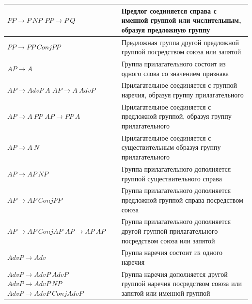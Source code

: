 \begin{longtable}{|L{.35\textwidth}|L{.55\textwidth}|}
	$PP \rightarrow P\ NP$\newline
	$PP \rightarrow P\ Q$ &
	Предлог соединяется справа с именной группой или числительным, образуя предложную группу\\\hline
	
	$PP \rightarrow PP\ ConjPP$ &
	Предложная группа другой предложной группой посредством союза или запятой\\\hline
	
	$AP \rightarrow A$ &
	Группа прилагательного состоит из одного слова со значением признака\\\hline
	
	$AP \rightarrow AdvP\ A$\newline
	$AP \rightarrow A\ AdvP$ &
	Прилагательное соединяется с группой наречия, образуя группу прилагательного\\\hline
	
	$AP \rightarrow A\ PP$\newline
	$AP \rightarrow PP\ A$ &
	Прилагательное соединяется с предложной группой, образуя группу прилагательного\\\hline
	
	$AP \rightarrow A\ N$ &
	Прилагательное соединяется с существительным образуя группу прилагательного\\\hline
	
	$AP \rightarrow AP\ NP$& Группа прилагательного дополняется группой существительного справа\\\hline
	
	
	$AP \rightarrow AP\ ConjPP$ &
	Группа прилагательного дополняется предложной группой справа посредством союза\\\hline
	
	$AP \rightarrow AP\ ConjAP$\newline
	$AP \rightarrow AP\ AP$ &
	Группа прилагательного дополняется другой группой прилагательного посредством союза или запятой\\\hline
	
	$AdvP \rightarrow Adv$ &
	Группа наречия состоит из одного наречия\\\hline
	
	$AdvP \rightarrow AdvP\ AdvP$\newline
	$AdvP \rightarrow AdvP\ NP$\newline
	$AdvP \rightarrow AdvP\ ConjAdvP$ &
	Группа наречия дополняется другой группой наречия посредством союза или запятой или именной группой\\\hline
	

\end{longtable}
